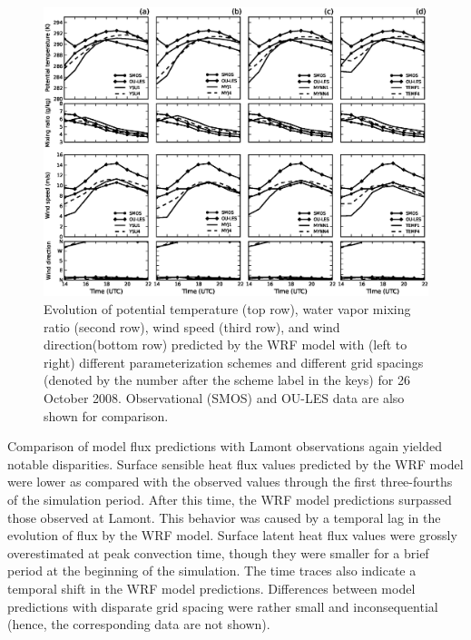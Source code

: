 \begin{figure}[ht!]
\begin{center}
\includegraphics[width=\textwidth]{figures/chapter4/meteogram_grid_20081026}
\end{center}
\caption{Evolution of potential temperature (top row), water vapor mixing ratio (second row), wind speed (third row), and wind direction(bottom row) predicted by the WRF model with (left to right) different parameterization schemes and different grid spacings (denoted by the number after the scheme label in the keys) for 26 October 2008. Observational (SMOS) and OU-LES data are also shown for comparison.}
\label{figure420}
\end{figure}


Comparison of model flux predictions with Lamont observations again yielded notable disparities. Surface sensible heat flux values predicted by the WRF model were lower as compared with the observed values through the first three-fourths of the simulation period. After this time, the WRF model predictions surpassed those observed at Lamont. This behavior was caused by a temporal lag in the evolution of flux by the WRF model. Surface latent heat flux values were grossly overestimated at peak convection time, though they were smaller for a brief period at the beginning of the simulation. The time traces also indicate a temporal shift in the WRF model predictions. Differences between model predictions with disparate grid spacing were rather small and inconsequential (hence, the corresponding data are not shown). 

